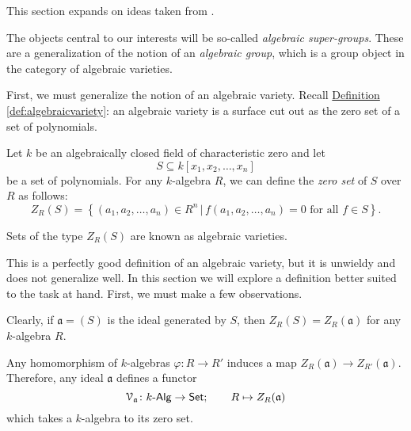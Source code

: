 \documentclass[a4paper,10pt]{scrreprt}
\def\mhyp{{\hbox{-}}}
\theoremstyle{definition}
\theoremstyle{plain}
\theoremstyle{remark}
\begin{document}
This section expands on ideas taken from \cite{milne-affine-group-schemes}.

The objects central to our interests will be so-called \emph{algebraic super-groups}. These are a generalization of the notion of an \emph{algebraic group}, which is a group object in the category of algebraic varieties.

First, we must generalize the notion of an algebraic variety. Recall \hyperref[def:algebraicvariety]{Definition \ref*{def:algebraicvariety}}: an algebraic variety is a surface cut out as the zero set of a set of polynomials. 

Let $k$ be an algebraically closed field of characteristic zero and let 
\begin{equation*}
  S \subseteq k[x_{1}, x_{2}, \ldots, x_{n}] 
\end{equation*}
be a set of polynomials. For any $k$-algebra $R$, we can define the \emph{zero set} of $S$ over $R$ as follows:
\begin{equation*}
  Z_{R}(S) = \left\{ (a_{1}, a_{2}, \ldots, a_{n}) \in R^{n} \,\big|\, f(a_{1}, a_{2}, \ldots, a_{n}) = 0\text{ for all }f \in S \right\}.
\end{equation*}

Sets of the type $Z_{R}(S)$ are known as algebraic varieties.

This is a perfectly good definition of an algebraic variety, but it is unwieldy and does not generalize well. In this section we will explore a definition better suited to the task at hand. First, we must make a few observations.

Clearly, if $\mathfrak{a} = (S)$ is the ideal generated by $S$, then $Z_{R}(S) = Z_{R}(\mathfrak{a})$ for any $k$-algebra $R$. 

Any homomorphism of $k$-algebras $\varphi\colon R \to R'$ induces a map $Z_{R}(\mathfrak{a}) \to Z_{R'}(\mathfrak{a})$. Therefore, any ideal $\mathfrak{a}$ defines a functor 
\begin{equation*}
  \mathcal{V}_{\mathfrak{a}}\colon k\mhyp\mathsf{Alg} \to \mathsf{Set};\qquad R \mapsto Z_{R}(\mathfrak{a})
\end{equation*}
which takes a $k$-algebra to its zero set.
\end{document}
